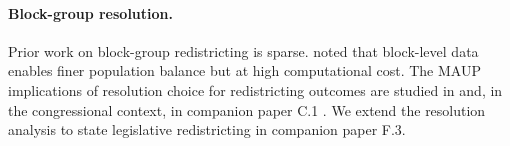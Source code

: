 \paragraph{Block-group resolution.}
Prior work on block-group redistricting is sparse. \citet{browdy1990computer}
noted that block-level data enables finer population balance but at high
computational cost. The MAUP implications of resolution choice for
redistricting outcomes are studied in \citet{openshaw1984modifiable}
and, in the congressional context, in companion paper C.1
\citep{dellaLibera2026maup}. We extend the resolution analysis to
state legislative redistricting in companion paper F.3.

